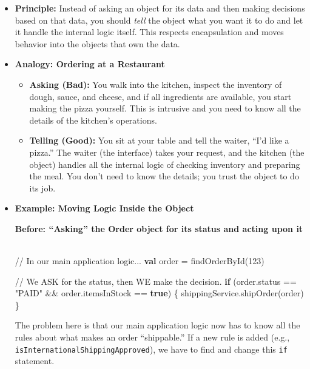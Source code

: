 \documentclass[
  letterpaper,
  DIV=11,
  numbers=noendperiod]{scrreprt}
\newenvironment{Shaded}{\begin{snugshade}}{\end{snugshade}}
\newcommand{\CommentTok}[1]{\textcolor[rgb]{0.37,0.37,0.37}{#1}}
\newcommand{\ControlFlowTok}[1]{\textcolor[rgb]{0.00,0.23,0.31}{\textbf{#1}}}
\newcommand{\DecValTok}[1]{\textcolor[rgb]{0.68,0.00,0.00}{#1}}
\newcommand{\FunctionTok}[1]{\textcolor[rgb]{0.28,0.35,0.67}{#1}}
\newcommand{\KeywordTok}[1]{\textcolor[rgb]{0.00,0.23,0.31}{\textbf{#1}}}
\newcommand{\NormalTok}[1]{\textcolor[rgb]{0.00,0.23,0.31}{#1}}
\newcommand{\OperatorTok}[1]{\textcolor[rgb]{0.37,0.37,0.37}{#1}}
\newcommand{\StringTok}[1]{\textcolor[rgb]{0.13,0.47,0.30}{#1}}
\providecommand{\tightlist}{%
  \setlength{\itemsep}{0pt}\setlength{\parskip}{0pt}}
\begin{document}
\begin{itemize}
\item
  \textbf{Principle:} Instead of asking an object for its data and then
  making decisions based on that data, you should \emph{tell} the object
  what you want it to do and let it handle the internal logic itself.
  This respects encapsulation and moves behavior into the objects that
  own the data.
\item
  \textbf{Analogy: Ordering at a Restaurant}

  \begin{itemize}
  \tightlist
  \item
    \textbf{Asking (Bad):} You walk into the kitchen, inspect the
    inventory of dough, sauce, and cheese, and if all ingredients are
    available, you start making the pizza yourself. This is intrusive
    and you need to know all the details of the kitchen's operations.
  \item
    \textbf{Telling (Good):} You sit at your table and tell the waiter,
    ``I'd like a pizza.'' The waiter (the interface) takes your request,
    and the kitchen (the object) handles all the internal logic of
    checking inventory and preparing the meal. You don't need to know
    the details; you trust the object to do its job.
  \end{itemize}
\item
  \textbf{Example: Moving Logic Inside the Object}

  \textbf{Before: ``Asking'' the Order object for its status and acting
  upon it 🤢}

\begin{Shaded}
\begin{Highlighting}[]
\CommentTok{// In our main application logic...}
\KeywordTok{val}\NormalTok{ order }\OperatorTok{=} \FunctionTok{findOrderById}\OperatorTok{(}\DecValTok{123}\OperatorTok{)}

\CommentTok{// We ASK for the status, then WE make the decision.}
\ControlFlowTok{if} \OperatorTok{(}\NormalTok{order}\OperatorTok{.}\NormalTok{status }\OperatorTok{==} \StringTok{"PAID"} \OperatorTok{\&\&}\NormalTok{ order}\OperatorTok{.}\NormalTok{itemsInStock }\OperatorTok{==} \KeywordTok{true}\OperatorTok{)} \OperatorTok{\{}
\NormalTok{  shippingService}\OperatorTok{.}\FunctionTok{shipOrder}\OperatorTok{(}\NormalTok{order}\OperatorTok{)}
\OperatorTok{\}}
\end{Highlighting}
\end{Shaded}

  The problem here is that our main application logic now has to know
  all the rules about what makes an order ``shippable.'' If a new rule
  is added (e.g., \texttt{isInternationalShippingApproved}), we have to
  find and change this \texttt{if} statement.


\end{itemize}
\end{document}
